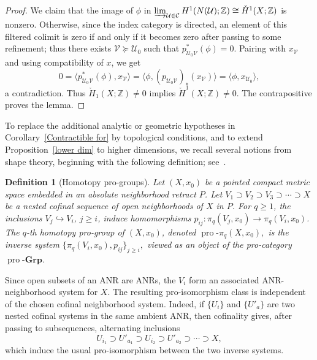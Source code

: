 \documentclass[12pt,oneside,a4paper]{article}
\newtheorem{definition}{Definition}[section]
\theoremstyle{mytheorem}
\theoremstyle{remark}
\theoremstyle{definition}
\begin{document}
\begin{proof}
We claim that the image of \(\phi\) in
\(\varinjlim_{\mathcal U\in\mathcal C} H^1(N(\mathcal U);\mathbb Z)
\cong
\check H^1(X;\mathbb Z)\)
is nonzero. Otherwise, since the index category is directed, an element of this
filtered colimit is zero if and only if it becomes zero after passing to some refinement;
thus there exists \(\mathcal V\succeq\mathcal U_0\) such that
$p_{\mathcal U_0\mathcal V}^*(\phi)=0.$
Pairing with \(x_{\mathcal V}\) and using compatibility of \(x\), we get
\[
0
=
\langle p_{\mathcal U_0\mathcal V}^*(\phi),x_{\mathcal V}\rangle
=
\langle \phi,(p_{\mathcal U_0\mathcal V})_*(x_{\mathcal V})\rangle
=
\langle \phi,x_{\mathcal U_0}\rangle,
\]
a contradiction. Thus \(\check H_1(X;\mathbb Z)\neq0\) implies
\(\check H^1(X;\mathbb Z)\neq0\). The contrapositive proves the lemma.
\end{proof}


To replace the additional analytic or geometric hypotheses in Corollary~\ref{Contractible for}
by topological conditions, and to extend Proposition~\ref{lower dim} to higher
dimensions, we recall several notions from shape theory, beginning with the
following definition; see~\cite[Section~7]{zbMATH07436589}.

\begin{definition}[Homotopy pro-groups]
Let \((X,x_0)\) be a pointed compact metric space embedded in an absolute
neighborhood retract \(P\). Let
\(V_1\supset V_2\supset V_3\supset\cdots\supset X\)
be a nested cofinal sequence of open neighborhoods of \(X\) in \(P\). For
\(q\ge 1\), the inclusions \(V_j\hookrightarrow V_i\), \(j\ge i\), induce
homomorphisms
\(p_{ij}\colon\pi_q(V_j,x_0)\to \pi_q(V_i,x_0)\).
The \(q\)-th homotopy pro-group of \((X,x_0)\), denoted
$\operatorname{pro}\text{-}\pi_q(X,x_0),$
is the inverse system
$\bigl\{\pi_q(V_i,x_0),p_{ij}\bigr\}_{j\ge i},$
viewed as an object of the pro-category \(\operatorname{pro}\text{-}\mathbf{Grp}\).
\end{definition}

Since open subsets of an ANR are ANRs, the \(V_i\) form an associated
ANR-neighborhood system for \(X\). The resulting pro-isomorphism class is
independent of the chosen cofinal neighborhood system. Indeed, if
\(\{U_i\}\) and \(\{U'_a\}\) are two nested cofinal systems in the same ambient
ANR, then cofinality gives, after passing to subsequences, alternating
inclusions
\[
U_{i_1}\supset U'_{a_1}\supset U_{i_2}\supset U'_{a_2}\supset\cdots\supset X,
\]
which induce the usual pro-isomorphism between the two inverse systems.
\end{document}
